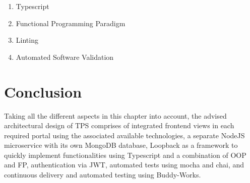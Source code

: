 \begin{enumerate}
	\item Typescript
	\item Functional Programming Paradigm
	\item Linting
	\item Automated Software Validation
\end{enumerate}

%
\section{Conclusion}
Taking all the different aspects in this chapter into account, the advised architectural design of TPS comprises of integrated frontend views in each required portal using the associated available technologies, a separate NodeJS microservice with its own MongoDB database, Loopback as a framework to quickly implement functionalities using Typescript and a combination of OOP and FP, authentication via JWT, automated tests using mocha and chai, and continuous delivery and automated testing using Buddy-Works.

